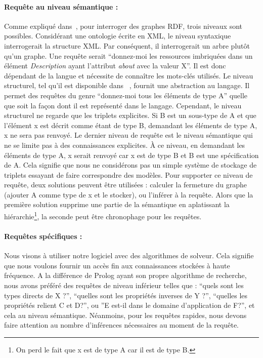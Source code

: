 \paragraph{Requête au niveau sémantique :} Comme expliqué dans~\cite{broekstra_2002_sesame}, pour interroger des graphes RDF, trois niveaux sont possibles. Considérant une ontologie écrite en XML, le niveau syntaxique interrogerait la structure XML. Par conséquent, il interrogerait un arbre plutôt qu'un graphe. Une requête serait ``donnez-moi les ressources imbriquées dans un élément \textit{Description} ayant l'attribut \textit{about} avec la valeur X''. Il est donc dépendant de la langue et nécessite de connaître les mots-clés utilisés. Le niveau structurel, tel qu'il est disponible dans ~\cite{lassila_1998_resource}, fournit une abstraction au langage. Il permet des requêtes du genre ``donnez-moi tous les éléments de type A'' quelle que soit la façon dont il est représenté dans le langage. Cependant, le niveau structurel ne regarde que les triplets explicites. Si B est un sous-type de A et que l'élément x est décrit comme étant de type B, demandant les éléments de type A, x ne sera pas renvoyé. Le dernier niveau de requête est le niveau sémantique qui ne se limite pas à des connaissances explicites. À ce niveau, en demandant les éléments de type A, x serait renvoyé car x est de type B et B est une spécification de A. Cela signifie que nous ne considérons pas un simple système de stockage de triplets essayant de faire correspondre des modèles. Pour supporter ce niveau de requête, deux solutions peuvent être utilisées : calculer la fermeture du graphe (ajouter A comme type de x et le stocker), ou l'inférer à la requête. Alors que la première solution supprime une partie de la sémantique en aplatissant la hiérarchie\footnote{On perd le fait que x est de type A car il est de type B.}, la seconde peut être chronophage pour les requêtes.

\paragraph{Requêtes spécifiques :} Nous visons à utiliser notre logiciel avec des algorithmes de solveur. Cela signifie que nous voulons fournir un accès fin aux connaissances stockées à haute fréquence. A la différence de Prolog ayant son propre algorithme de recherche, nous avons préféré des requêtes de niveau inférieur telles que : ``quels sont les types directs de X ?'', ``quelles sont les propriétés inverses de Y ?'', ``quelles les propriétés relient C et D?'', ou ''E est-il dans le domaine d'application de F?'', et cela au niveau sémantique. Néanmoins, pour les requêtes rapides, nous devons faire attention au nombre d'inférences nécessaires au moment de la requête.


